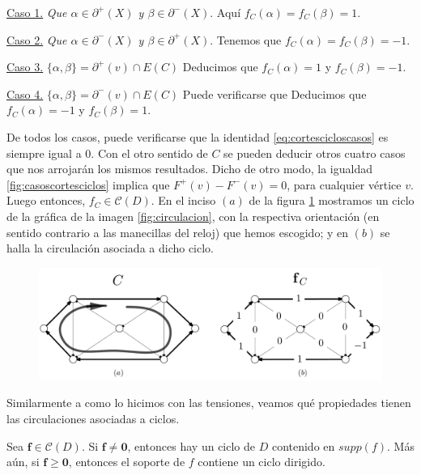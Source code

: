 \underline{Caso 1.} \textit{Que $\alpha \in \partial^{+}(X)$ y $\beta \in \partial^{-}(X)$}. Aquí $f_{C} (\alpha)= f_{C}(\beta) = 1.$

\underline{Caso 2.} \textit{Que $\alpha \in \partial^{-}(X)$ y $\beta \in \partial^{+}(X)$}. Tenemos que $f_{C} (\alpha)= f_{C}(\beta) = -1$.

\underline{Caso 3.} $\{\alpha, \beta\} = \partial^{+}(v) \cap E(C)$ Deducimos que $f_{C}(\alpha)=1$ y $f_{C}(\beta)=-1.$

\underline{Caso 4.} $\{\alpha, \beta\} = \partial^{-}(v) \cap E(C)$ Puede verificarse que Deducimos que $f_{C}(\alpha)= -1$ y $f_{C}(\beta)=1.$

De todos los casos, puede verificarse que la identidad \ref{eq:cortescicloscasos} es siempre igual a $0$. Con el otro sentido de $C$ se pueden deducir otros cuatro casos que nos arrojarán los mismos resultados. Dicho de otro modo, la igualdad \ref{fig:casoscortesciclos} implica que $F^{+}(v) - F^{-}(v) = 0$, para cualquier vértice $v$. Luego entonces, $f_{C} \in \mathcal{C}(D)$. En el inciso $(a)$ de la figura \ref{fig:circulacionciclo} mostramos un ciclo de la gráfica de la imagen \ref{fig:circulacion}, con la respectiva orientación (en sentido contrario a las manecillas del reloj) que hemos escogido; y en $(b)$ se halla la circulación asociada a dicho ciclo.
\begin{figure}[H]
    \centering
    \includegraphics[scale=0.19]{img/imgchapter2/circulacionciclo.jpg}
    \caption{}
    \label{fig:circulacionciclo}
\end{figure}


Similarmente a como lo hicimos con las tensiones, veamos qué propiedades tienen las circulaciones asociadas a ciclos.

\begin{lema} \label{lema:circulacion}
Sea $\mathbf{f} \in \mathcal{C}(D)$. Si $\mathbf{f} \neq \mathbf{0}$, entonces hay un ciclo de $D$ contenido en $supp(f)$. Más aún, si $\mathbf{f} \geq \mathbf{0}$, entonces el soporte de $f$ contiene un ciclo dirigido.
\end{lema}


